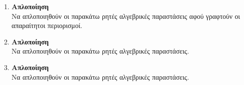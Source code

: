 \documentclass{askhseis}
\begin{document}
\begin{enumerate}
Να απλοποιηθούν οι παρακάτω ρητές αλγεβρικές παραστάσεις.
\begin{multicols}{2}
\end{multicols}
\item \textbf{Απλοποίηση}\\
Να απλοποιηθούν οι παρακάτω ρητές αλγεβρικές παραστάσεις αφού γραφτούν οι απαραίτητοι περιορισμοί.
\begin{multicols}{2}
\end{multicols}
\item \textbf{Απλοποίηση}\\
Να απλοποιηθούν οι παρακάτω ρητές αλγεβρικές παραστάσεις.
\begin{multicols}{2}
\end{multicols}
\item \textbf{Απλοποίηση}\\
Να απλοποιηθούν οι παρακάτω ρητές αλγεβρικές παραστάσεις.
\begin{multicols}{2}

\end{multicols}
\end{enumerate}
\end{document}
